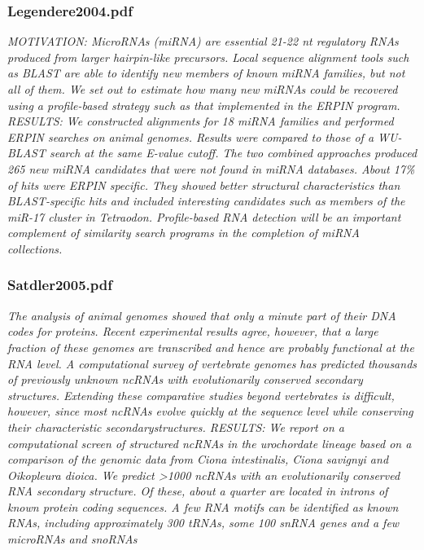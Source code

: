 \documentclass[graybox]{svmult}
\begin{document}
\subsubsection{Legendere2004.pdf}
\cite{Legendre2005}
\textit{MOTIVATION: MicroRNAs (miRNA) are essential 21-22 nt regulatory RNAs produced from larger hairpin-like precursors. Local sequence alignment tools such as BLAST are able to identify new members of known miRNA families, but not all of them. We set out to estimate how many new miRNAs could be recovered using a profile-based strategy such as that implemented in the ERPIN program. RESULTS: We constructed alignments for 18 miRNA families and performed ERPIN searches on animal genomes. Results were compared to those of a WU-BLAST search at the same E-value cutoff. The two combined approaches produced 265 new miRNA candidates that were not found in miRNA databases. About 17{\%} of hits were ERPIN specific. They showed better structural characteristics than BLAST-specific hits and included interesting candidates such as members of the miR-17 cluster in Tetraodon. Profile-based RNA detection will be an important complement of similarity search programs in the completion of miRNA collections.}

\subsubsection{Satdler2005.pdf}
\cite{Missal2005} 
\textit{The analysis of animal genomes showed that only a minute part of their DNA codes for proteins. Recent experimental results agree, however, that a large fraction of these genomes are transcribed and hence are probably functional at the RNA level. A computational survey of vertebrate genomes has predicted thousands of previously unknown ncRNAs with evolutionarily conserved secondary structures. Extending these comparative studies beyond vertebrates is difficult, however, since most ncRNAs evolve quickly at the sequence level while conserving their characteristic secondarystructures. RESULTS: We report on a computational screen of structured ncRNAs in the urochordate lineage based on a comparison of the genomic data from Ciona intestinalis, Ciona savignyi and Oikopleura dioica. We predict {\textgreater}1000 ncRNAs with an evolutionarily conserved RNA secondary structure. Of these, about a quarter are located in introns of known protein coding sequences. A few RNA motifs can be identified as known RNAs, including approximately 300 tRNAs, some 100 snRNA genes and a few microRNAs and snoRNAs}
\end{document}
